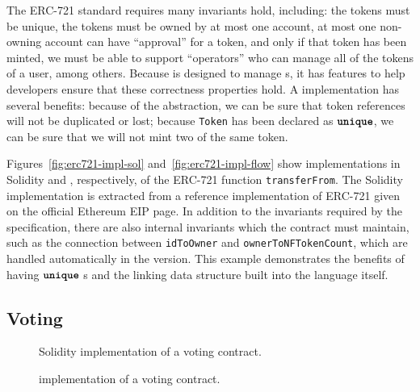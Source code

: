 \documentclass[dvipsnames, usenames, sigconf]{acmart}
\begin{document}
The ERC-721 standard  requires many invariants hold, including:
    the tokens must be unique,
    the tokens must be owned by at most one account,
    at most one non-owning account can have ``approval'' for a token, and only if that token has been minted,
    we must be able to support ``operators'' who can manage all of the tokens of a user,
    among others.
Because \langName is designed to manage \assetTxt{}s, it has features to help developers ensure that these correctness properties hold.
A \langName implementation has several benefits: because of the \assetTxt abstraction, we can be sure that token references will not be duplicated or lost; because \lstinline{Token} has been declared as $\textbf{\texttt{unique}}$, we can be sure that we will not mint two of the same token.

Figures~\ref{fig:erc721-impl-sol} and~\ref{fig:erc721-impl-flow} show implementations in Solidity and \langName, respectively, of the ERC-721 function \lstinline{transferFrom}.
The Solidity implementation is extracted from a reference implementation of ERC-721 given on the official Ethereum EIP page.
In addition to the invariants required by the specification, there are also internal invariants which the contract must maintain, such as the connection between \lstinline{idToOwner} and \lstinline{ownerToNFTokenCount}, which are handled automatically in the \langName version.
This example demonstrates the benefits of having $\textbf{\texttt{unique}}$ \assetTxt{}s and the linking data structure built into the language itself.

\subsection{Voting}
\begin{figure*}[h]
    \centering
    \begin{subfigure}[t]{0.5\textwidth}
        \centering
        
        \caption{Solidity implementation of a voting contract.}
        \label{fig:voting-impl-sol}
    \end{subfigure}%
    \begin{subfigure}[t]{0.5\textwidth}
        \centering
        
        \caption{\langName implementation of a voting contract.}
        \label{fig:voting-impl-flow}
    \end{subfigure}
    \label{fig:voting-impl}
\end{figure*}
\end{document}
